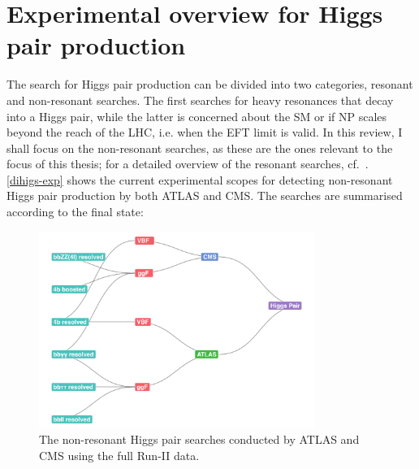\section{Experimental overview for Higgs pair production \label{exphh}  }
The search for Higgs pair production can be divided into two categories, resonant and non-resonant searches. The first searches for heavy resonances that decay into a Higgs pair, while the latter is concerned about the SM or if NP scales beyond the reach of the LHC, i.e. when the EFT limit is valid. In this review, I shall focus on the non-resonant searches, as these are the ones relevant to the focus of this thesis; for a detailed overview of the resonant searches, cf.~\cite{DiMicco:2019ngk}.\\
%
\autoref{dihigs-exp} shows the current experimental scopes for detecting non-resonant Higgs pair production by both ATLAS and CMS. The searches are summarised according to the final state:
\begin{figure}[!htpb]
	\centering
	\includegraphics[width = 0.8\textwidth]{./figures/HH-exp-network}
	\caption{The non-resonant Higgs pair searches conducted by ATLAS and CMS using the full Run-II data.} 
	\label{dihigs-exp}
\end{figure}
